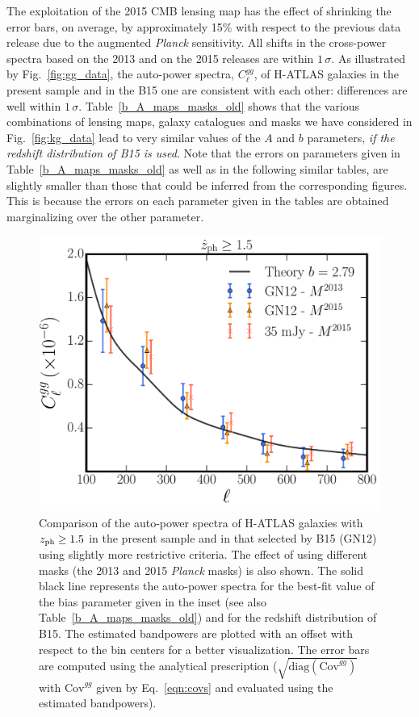 The exploitation of the 2015 CMB lensing map has the effect of shrinking the error bars, on average, by approximately 15\% with respect to the
previous data release due to the augmented  \emph{Planck} sensitivity. All shifts in the cross-power spectra based on the 2013 and on the 2015
releases are within $1\,\sigma$. As illustrated by Fig.~\eqref{fig:gg_data}, the auto-power spectra, $C_{\ell}^{gg}$, of H-ATLAS galaxies in the present sample and in the B15 one are consistent with each other: differences are well within $1\,\sigma$. Table~\eqref{b_A_maps_masks_old} shows that the various combinations of lensing maps, galaxy catalogues and masks we have considered in Fig.~\eqref{fig:kg_data} lead to very similar values of the $A$ and $b$ parameters, \emph{if the redshift distribution of B15 is used}. Note that the errors on parameters given in Table~\eqref{b_A_maps_masks_old} as well as in the following similar tables, are slightly smaller than those that could be inferred from the corresponding figures. This is because the errors on each parameter given in the tables are obtained marginalizing over the other parameter.

\begin{figure} %
\centering %
\includegraphics[width=\textwidth]{Chapter4/Images/gg_ALL_2013_2015_z15_10_allcomparisons}
\caption{Comparison of the auto-power spectra of H-ATLAS galaxies with $z_{\rm{ph}} \ge 1.5$ in the present sample and in that selected by B15 (GN12) using slightly more restrictive criteria. The effect of using different masks (the 2013 and 2015 \emph{Planck} masks) is also shown. The solid black line represents the auto-power spectra for the best-fit value of the bias parameter given in the inset (see also Table~\eqref{b_A_maps_masks_old}) and for the redshift distribution of B15. The estimated bandpowers are plotted with an offset with respect to the bin centers for a better visualization. The error bars are computed using the analytical prescription ($\sqrt{\text{diag}(\text{Cov}^{gg})}$ with $\text{Cov}^{gg}$ given by Eq.~\eqref{eqn:covs} and evaluated using the estimated bandpowers).   \label{fig:gg_data}}
\end{figure}


